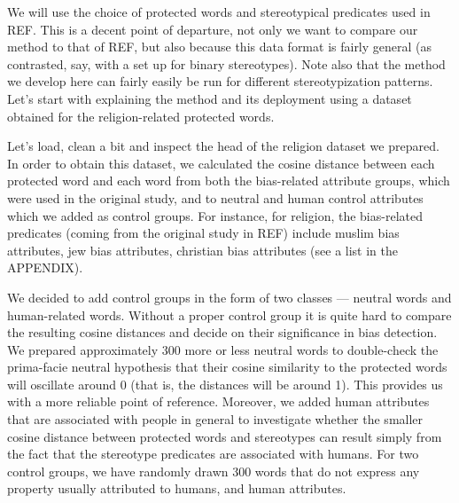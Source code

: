 \documentclass[]{book}
\begin{document}
We will use the choice of protected words and stereotypical predicates
used in REF. This is a decent point of departure, not only we want to
compare our method to that of REF, but also because this data format is
fairly general (as contrasted, say, with a set up for binary
stereotypes). Note also that the method we develop here can fairly
easily be run for different stereotypization patterns. Let's start with
explaining the method and its deployment using a dataset obtained for
the religion-related protected words.

Let's load, clean a bit and inspect the head of the religion dataset we
prepared. In order to obtain this dataset, we calculated the cosine
distance between each protected word and each word from both the
bias-related attribute groups, which were used in the original study,
and to neutral and human control attributes which we added as control
groups. For instance, for religion, the bias-related predicates (coming
from the original study in REF) include muslim bias attributes, jew bias
attributes, christian bias attributes (see a list in the APPENDIX).

We decided to add control groups in the form of two classes --- neutral
words and human-related words. Without a proper control group it is
quite hard to compare the resulting cosine distances and decide on their
significance in bias detection. We prepared approximately
300 more or less neutral words to double-check the
prima-facie neutral hypothesis that their cosine similarity to the
protected words will oscillate around 0 (that is, the distances will be
around 1). This provides us with a more reliable point of reference.
Moreover, we added human attributes that are associated with people in
general to investigate whether the smaller cosine distance between
protected words and stereotypes can result simply from the fact that the
stereotype predicates are associated with humans. For two control
groups, we have randomly drawn 300 words that do not express any
property usually attributed to humans, and human attributes.

\vspace{1mm} \footnotesize
\end{document}
